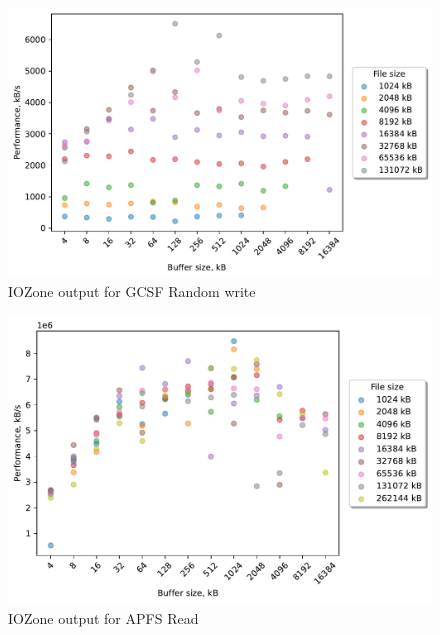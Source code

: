 \begin{figure}[!htb]
	\label{fig:bench_gcsf_rnd_write}
	\begin{center}
		\includegraphics[width=1.0\textwidth]{figures.nosync/benchmarking/gcsf/Random write.pdf}
	\end{center}
	\caption{IOZone output for GCSF Random write}
\end{figure}

\begin{figure}[!htb]
	\label{fig:bench_apfs_read}
	\begin{center}
		\includegraphics[width=1.0\textwidth]{figures.nosync/benchmarking/local/Read.pdf}
	\end{center}
	\caption{IOZone output for \gls{APFS} Read}
\end{figure}

